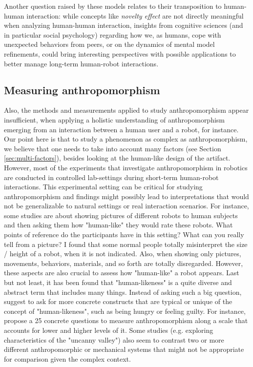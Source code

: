 \documentclass{frontiersSCNS} %
\begin{document}
Another question raised by these models relates to their transposition to
human-human interaction: while concepts like \emph{novelty effect} are not
directly meaningful when analyzing human-human interaction, insights from
cognitive sciences (and in particular social psychology) regarding how we, as
humans, cope with unexpected behaviors from peers, or on the dynamics of mental
model refinements, could bring interesting perspectives with possible
applications to better manage long-term human-robot interactions.

\subsection{Measuring anthropomorphism}
\label{sec:measuring}


\citep{ruijten_introducing_2014}

Also, the methods and measurements applied to study anthropomorphism appear insufficient, when applying a holistic understanding of anthropomorphism emerging from an interaction between a human user and a robot, for instance. Our point here is that to study a phenomenon as complex as anthropomorphism, we believe that one needs to take into account many factors (see Section \ref{sec:multi-factors}), besides looking at the human-like design of the artifact.
However, most of the
experiments that investigate anthropomorphism in robotics are conducted in
controlled lab-settings during short-term human-robot interactions. This
experimental setting can be critical for studying
anthropomorphism and findings might possibly lead to interpretations that would not be generalizable to natural settings or real interaction scenarios. For instance, some studies are about showing pictures of different robots to human subjects and then asking them how "human-like" they would rate these robots. What points of reference do the participants have in this setting? What can you really tell from a picture? I found that some normal people totally misinterpret the size / height of a robot, when it is not indicated. Also, when showing only pictures, movements, behaviors, materials, and so forth are totally disregarded. However, these aspects are also crucial to assess how "human-like" a robot appears. Last but not least, it has been found that "human-likeness" is a quite diverse and abstract term that includes many things. Instead of asking such a big question, \cite{kahn_jr._robotic_2006} suggest to ask for more concrete constructs that are typical or unique of the concept of "human-likeness", such as being hungry or feeling guilty. For instance, \cite{ruijten_introducing_2014} propose a 25 concrete questions to measure anthropomorphism along a scale that accounts for lower and higher levels of it.
Some studies (e.g. exploring characteristics of the "uncanny valley") also seem to contrast two or
more different anthropomorphic or mechanical systems that might not be
appropriate for comparison given the complex context. 
\end{document}
